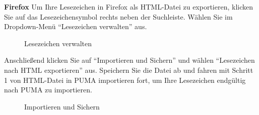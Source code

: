 \textbf{Firefox}
\newline Um Ihre Lesezeichen in Firefox als HTML-Datei zu exportieren, klicken Sie auf das Lesezeichensymbol rechts neben der Suchleiste. Wählen Sie im Dropdown-Menü \enquote{Lesezeichen verwalten} aus.

\begin{figure}[h!]
 \centering
 \caption{Lesezeichen verwalten}
 \label{figure015}
\end{figure}
Anschließend klicken Sie auf \enquote{Importieren und Sichern} und wählen \enquote{Lesezeichen nach HTML exportieren} aus. Speichern Sie die Datei ab und fahren mit Schritt 1 von HTML-Datei in PUMA importieren fort, um Ihre Lesezeichen endgültig nach PUMA zu importieren.  

\begin{figure}[h!]
 \centering
 \caption{Importieren und Sichern}
 \label{figure016}
\end{figure}
